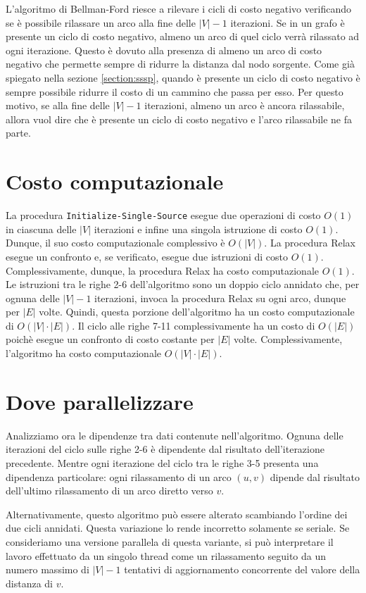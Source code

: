 \documentclass[12pt,a4paper,oneside]{book}
\begin{document}
	L'algoritmo di Bellman-Ford riesce a rilevare i cicli di costo negativo verificando se è possibile rilassare un arco alla fine delle $|V|-1$ iterazioni. Se in un grafo è presente un ciclo di costo negativo, almeno un arco di quel ciclo verrà rilassato ad ogni iterazione. Questo è dovuto alla presenza di almeno un arco di costo negativo che permette sempre di ridurre la distanza dal nodo sorgente. Come già spiegato nella sezione \ref{section:sssp}, quando è presente un ciclo di costo negativo è sempre possibile ridurre il costo di un cammino che passa per esso. Per questo motivo, se alla fine delle $|V|-1$ iterazioni, almeno un arco è ancora rilassabile, allora vuol dire che è presente un ciclo di costo negativo e l'arco rilassabile ne fa parte.

	\section{Costo computazionale}
	La procedura \texttt{Initialize-Single-Source} esegue due operazioni di costo $O(1)$ in ciascuna delle $|V|$ iterazioni e infine una singola istruzione di costo $O(1)$. Dunque, il suo costo computazionale complessivo è $O(|V|)$. La procedura Relax esegue un confronto e, se verificato, esegue due istruzioni di costo $O(1)$. Complessivamente, dunque, la procedura Relax ha costo computazionale $O(1)$. Le istruzioni tra le righe 2-6 dell'algoritmo sono un doppio ciclo annidato che, per ognuna delle $|V|-1$ iterazioni, invoca la procedura Relax su ogni arco, dunque per $|E|$ volte. Quindi, questa porzione dell'algoritmo ha un costo computazionale di $O(|V|\cdot |E|)$. Il ciclo alle righe 7-11 complessivamente ha un costo di $O(|E|)$ poichè esegue un confronto di costo costante per $|E|$ volte. Complessivamente, l'algoritmo ha costo computazionale $O(|V|\cdot |E|)$.
	
	\section{Dove parallelizzare}
	Analizziamo ora le dipendenze tra dati contenute nell'algoritmo. Ognuna delle iterazioni del ciclo sulle righe 2-6 è dipendente dal risultato dell'iterazione precedente. Mentre ogni iterazione del ciclo tra le righe 3-5 presenta una dipendenza particolare: ogni rilassamento di un arco $(u,v)$ dipende dal risultato dell'ultimo rilassamento di un arco diretto verso $v$.
	
	Alternativamente, questo algoritmo può essere alterato scambiando l'ordine dei due cicli annidati. Questa variazione lo rende incorretto solamente se seriale. Se consideriamo una versione parallela di questa variante, si può interpretare il lavoro effettuato da un singolo thread come un rilassamento seguito da un numero massimo di $|V|-1$ tentativi di aggiornamento concorrente del valore della distanza di $v$.
	
\end{document}
